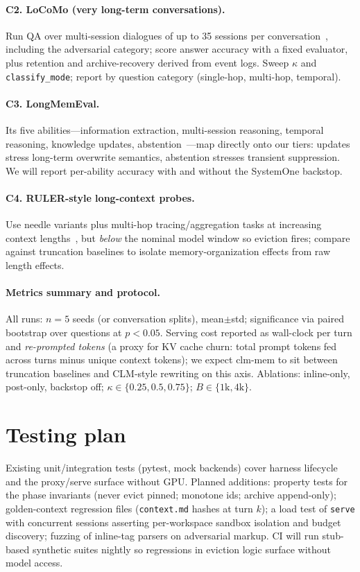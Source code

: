 \documentclass[10pt]{article}
\begin{document}
\paragraph{C2. LoCoMo (very long-term conversations).}
Run QA over multi-session dialogues of up to 35 sessions per conversation~\cite{locomo}, including the adversarial category; score answer accuracy with a fixed evaluator, plus retention and archive-recovery derived from event logs. Sweep $\kappa$ and \texttt{classify\_mode}; report by question category (single-hop, multi-hop, temporal).

\paragraph{C3. LongMemEval.}
Its five abilities---information extraction, multi-session reasoning, temporal reasoning, knowledge updates, abstention~\cite{longmemeval}---map directly onto our tiers: updates stress long-term overwrite semantics, abstention stresses transient suppression. We will report per-ability accuracy with and without the SystemOne backstop.

\paragraph{C4. RULER-style long-context probes.}
Use needle variants plus multi-hop tracing/aggregation tasks at increasing context lengths~\cite{ruler}, but \emph{below} the nominal model window so eviction fires; compare against truncation baselines to isolate memory-organization effects from raw length effects.

\paragraph{Metrics summary and protocol.}
All runs: $n=5$ seeds (or conversation splits), mean$\pm$std; significance via paired bootstrap over questions at $p<0.05$. Serving cost reported as wall-clock per turn and \emph{re-prompted tokens} (a proxy for KV cache churn: total prompt tokens fed across turns minus unique context tokens); we expect clm-mem to sit between truncation baselines and CLM-style rewriting on this axis. Ablations: inline-only, post-only, backstop off; $\kappa\in\{0.25,0.5,0.75\}$; $B\in\{1\text{k},4\text{k}\}$.

\section{Testing plan}
Existing unit/integration tests (pytest, mock backends) cover harness lifecycle and the proxy/serve surface without GPU. Planned additions: property tests for the phase invariants (never evict pinned; monotone ids; archive append-only); golden-context regression files (\texttt{context.md} hashes at turn $k$); a load test of \texttt{serve} with concurrent sessions asserting per-workspace sandbox isolation and budget discovery; fuzzing of inline-tag parsers on adversarial markup. CI will run stub-based synthetic suites nightly so regressions in eviction logic surface without model access.
\end{document}
